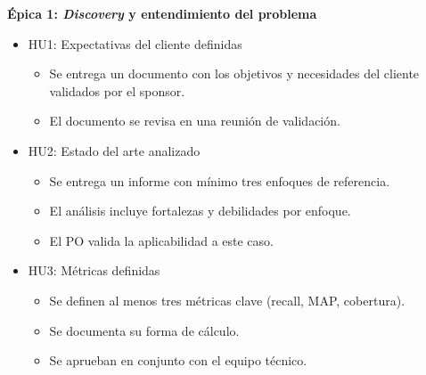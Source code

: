 \documentclass[
11pt, %
]{charter}
\begin{document}
\textbf{\'Epica 1: \textit{Discovery} y entendimiento del problema}
\begin{itemize}
  \item HU1: Expectativas del cliente definidas
  \begin{itemize}
    \item Se entrega un documento con los objetivos y necesidades del cliente validados por el sponsor.
    \item El documento se revisa en una reunión de validación.
  \end{itemize}
  \item HU2: Estado del arte analizado
  \begin{itemize}
    \item Se entrega un informe con mínimo tres enfoques de referencia.
    \item El análisis incluye fortalezas y debilidades por enfoque.
    \item El PO valida la aplicabilidad a este caso.
  \end{itemize}
  \item HU3: Métricas definidas
  \begin{itemize}
    \item Se definen al menos tres métricas clave (recall, MAP, cobertura).
    \item Se documenta su forma de cálculo.
    \item Se aprueban en conjunto con el equipo técnico.
  \end{itemize}
\end{itemize}
\end{document}
